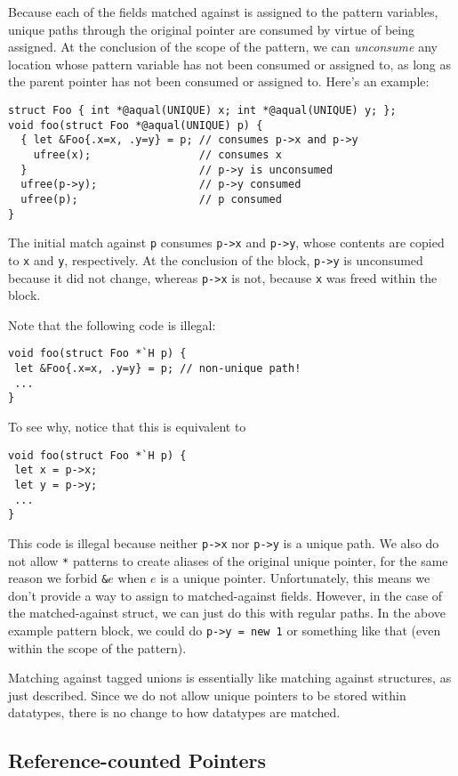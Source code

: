 Because each of the fields matched against is assigned to the pattern
variables, unique paths through the original pointer are consumed by virtue
of being assigned.  At the conclusion of the scope of the pattern, we can
\emph{unconsume} any location whose pattern variable has not been consumed
or assigned to, as long as the parent pointer has not been consumed or
assigned to.  Here's an example:
\begin{verbatim}
struct Foo { int *@aqual(UNIQUE) x; int *@aqual(UNIQUE) y; };
void foo(struct Foo *@aqual(UNIQUE) p) {
  { let &Foo{.x=x, .y=y} = p; // consumes p->x and p->y
    ufree(x);                 // consumes x
  }                           // p->y is unconsumed
  ufree(p->y);                // p->y consumed
  ufree(p);                   // p consumed
}
\end{verbatim}
The initial match against \texttt{p} consumes \texttt{p->x} and
\texttt{p->y}, whose contents are copied to \texttt{x} and \texttt{y},
respectively.  At the conclusion of the block, \texttt{p->y} is unconsumed
because it did not change, whereas \texttt{p->x} is not, because \texttt{x}
was freed within the block.

Note that the following code is illegal:
\begin{verbatim}
void foo(struct Foo *`H p) {
 let &Foo{.x=x, .y=y} = p; // non-unique path!
 ...
}
\end{verbatim}
To see why, notice that this is equivalent to
\begin{verbatim}
void foo(struct Foo *`H p) {
 let x = p->x;
 let y = p->y;
 ...
}
\end{verbatim}
This code is illegal because neither \texttt{p->x} nor \texttt{p->y} is a
unique path.  We also do not allow \texttt{*} patterns to create aliases of
the original unique pointer, for the same reason we forbid \texttt{\&}$e$
when $e$ is a unique pointer.  Unfortunately, this means we don't provide a
way to assign to matched-against fields.  However, in the case of the
matched-against struct, we can just do this with regular paths.  In the
above example pattern block, we could do \texttt{p->y = new 1} or something
like that (even within the scope of the pattern).

Matching against tagged unions is essentially like matching against
structures, as just described.  Since we do not allow unique pointers to be
stored within datatypes, there is no change to how datatypes are
matched.


\subsection{Reference-counted Pointers}

